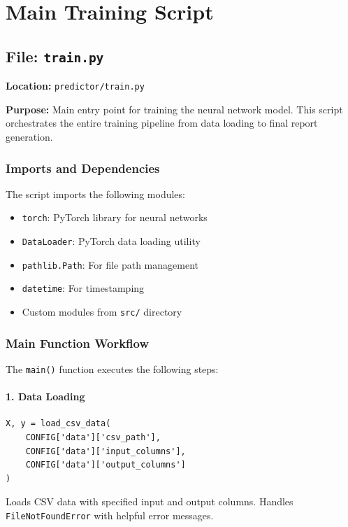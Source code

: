 \documentclass[11pt,a4paper]{article}
\begin{document}
\newpage
\section{Main Training Script}

\subsection{File: \texttt{train.py}}

\textbf{Location:} \texttt{predictor/train.py}

\textbf{Purpose:} Main entry point for training the neural network model. This script orchestrates the entire training pipeline from data loading to final report generation.

\subsubsection{Imports and Dependencies}

The script imports the following modules:
\begin{itemize}
    \item \texttt{torch}: PyTorch library for neural networks
    \item \texttt{DataLoader}: PyTorch data loading utility
    \item \texttt{pathlib.Path}: For file path management
    \item \texttt{datetime}: For timestamping
    \item Custom modules from \texttt{src/} directory
\end{itemize}

\subsubsection{Main Function Workflow}

The \texttt{main()} function executes the following steps:

\paragraph{1. Data Loading}
\begin{lstlisting}
X, y = load_csv_data(
    CONFIG['data']['csv_path'],
    CONFIG['data']['input_columns'],
    CONFIG['data']['output_columns']
)
\end{lstlisting}

Loads CSV data with specified input and output columns. Handles \texttt{FileNotFoundError} with helpful error messages.
\end{document}
